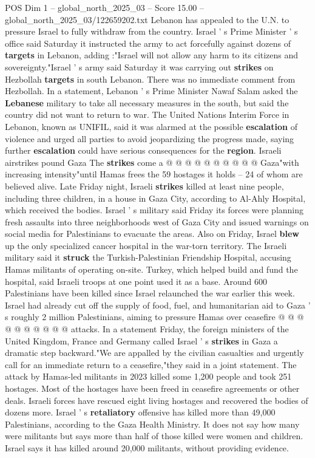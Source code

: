 \begin{textsample}{POS Dim 1 – global\_north\_2025\_03 – Score 15.00 – global\_north\_2025\_03/122659202.txt}
Lebanon has appealed to the U.N. to pressure Israel to fully withdraw from the country.
Israel ' s Prime Minister ' s office said Saturday it instructed the army to act forcefully against dozens of \textbf{targets} in Lebanon, adding :"Israel will not allow any harm to its citizens and sovereignty."Israel ' s army said Saturday it was carrying out \textbf{strikes} on Hezbollah \textbf{targets} in south Lebanon.
There was no immediate comment from Hezbollah.
In a statement, Lebanon ' s Prime Minister Nawaf Salam asked the \textbf{Lebanese} military to take all necessary measures in the south, but said the country did not want to return to war.
The United Nations Interim Force in Lebanon, known as UNIFIL, said it was alarmed at the possible \textbf{escalation} of violence and urged all parties to avoid jeopardizing the progress made, saying further \textbf{escalation} could have serious consequences for the \textbf{region}.
Israeli airstrikes pound Gaza The \textbf{strikes} come a @ @ @ @ @ @ @ @ @ @ Gaza"with increasing intensity"until Hamas frees the 59 hostages it holds -- 24 of whom are believed alive.
Late Friday night, Israeli \textbf{strikes} killed at least nine people, including three children, in a house in Gaza City, according to Al-Ahly Hospital, which received the bodies.
Israel ' s military said Friday its forces were planning fresh assaults into three neighborhoods west of Gaza City and issued warnings on social media for Palestinians to evacuate the areas.
Also on Friday, Israel \textbf{blew} up the only specialized cancer hospital in the war-torn territory.
The Israeli military said it \textbf{struck} the Turkish-Palestinian Friendship Hospital, accusing Hamas militants of operating on-site.
Turkey, which helped build and fund the hospital, said Israeli troops at one point used it as a base.
Around 600 Palestinians have been killed since Israel relaunched the war earlier this week.
Israel had already cut off the supply of food, fuel, and humanitarian aid to Gaza ' s roughly 2 million Palestinians, aiming to pressure Hamas over ceasefire @ @ @ @ @ @ @ @ @ @ attacks.
In a statement Friday, the foreign ministers of the United Kingdom, France and Germany called Israel ' s \textbf{strikes} in Gaza a dramatic step backward."We are appalled by the civilian casualties and urgently call for an immediate return to a ceasefire,"they said in a joint statement.
The attack by Hamas-led militants in 2023 killed some 1,200 people and took 251 hostages.
Most of the hostages have been freed in ceasefire agreements or other deals.
Israeli forces have rescued eight living hostages and recovered the bodies of dozens more.
Israel ' s \textbf{retaliatory} offensive has killed more than 49,000 Palestinians, according to the Gaza Health Ministry.
It does not say how many were militants but says more than half of those killed were women and children.
Israel says it has killed around 20,000 militants, without providing evidence.

\end{textsample}
